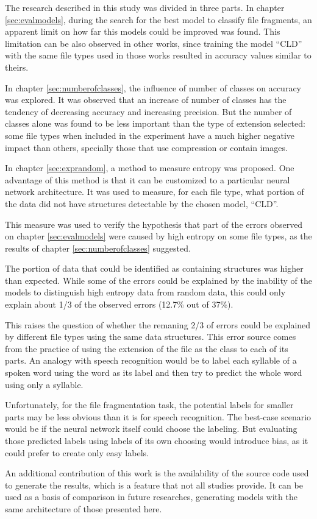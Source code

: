 The research described in this study was divided in three parts.
In chapter \ref{sec:evalmodels}, during the search for the best model to classify file fragments, an apparent limit on how far this models could be improved was found. This limitation can be also observed in other works, since training the model ``CLD'' with the same file types used in those works resulted in accuracy values similar to theirs.

In chapter \ref{sec:numberofclasses}, the influence of number of classes on accuracy was explored. It was observed that an increase of number of classes has the tendency of decreasing accuracy and increasing precision. But the number of classes alone was found to be less important than the type of extension selected: some file types when included in the experiment have a much higher negative impact than others, specially those that use compression or contain images.

In chapter \ref{sec:exprandom}, a method to measure entropy was proposed. One advantage of this method is that it can be customized to a particular neural network architecture. It was used to measure, for each file type, what portion of the data did not have structures detectable by the chosen model, ``CLD''.

This measure was used to verify the hypothesis that part of the errors observed on chapter \ref{sec:evalmodels} were caused by high entropy on some file types, as the results of chapter  \ref{sec:numberofclasses} suggested.

The portion of data that could be identified as containing structures was higher than expected. While some of the errors could be explained by the inability of the models to distinguish  high entropy data from random data, this could only explain about 1/3 of the observed errors (12.7\% out of 37\%).

This raises the question of whether the remaning 2/3 of errors could be explained by different file types using the same data structures. This error source comes from the practice of using the extension of the file as the class to each of its parts. An analogy with speech recognition would be to label each syllable of a spoken word using the word as its label and then try to predict the whole word using only a syllable.

Unfortunately, for the file fragmentation task, the potential labels for smaller parts may be less obvious than it is for speech recognition. The best-case scenario would be if the neural network itself could choose the labeling. But evaluating those predicted labels using labels of its own choosing would introduce bias, as it could prefer to create only easy labels.

An additional contribution of this work is the availability of the source code used to generate the results, which is a feature that not all studies provide. It can be used as a basis of comparison in future researches, generating models with the same architecture of those presented here.